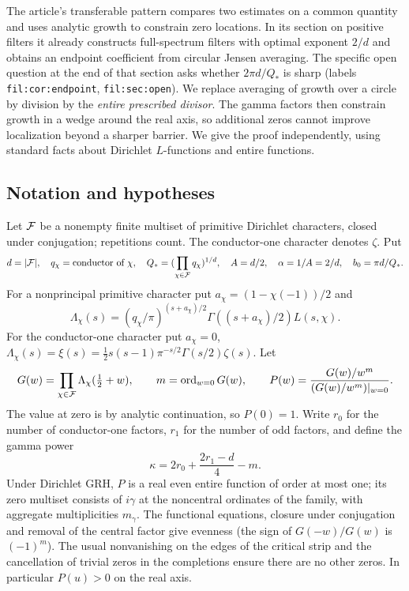 \documentclass[11pt]{article}
\theoremstyle{definition}\newtheorem{definition}[theorem]{Definition}
\theoremstyle{remark}\newtheorem{remark}[theorem]{Remark}
\begin{document}
The article's transferable pattern compares two estimates on a common quantity and uses analytic growth to constrain zero locations. In its section on positive filters it already constructs full-spectrum filters with optimal exponent $2/d$ and obtains an endpoint coefficient from circular Jensen averaging. The specific open question at the end of that section asks whether $2\pi d/Q_*$ is sharp (labels \texttt{fil:cor:endpoint}, \texttt{fil:sec:open}). We replace averaging of growth over a circle by division by the \emph{entire prescribed divisor}. The gamma factors then constrain growth in a wedge around the real axis, so additional zeros cannot improve localization beyond a sharper barrier. We give the proof independently, using standard facts about Dirichlet $L$-functions and entire functions.

\subsection{Notation and hypotheses}
Let $\mathcal F$ be a nonempty finite multiset of primitive Dirichlet characters, closed under conjugation; repetitions count. The conductor-one character denotes $\zeta$. Put
\[
 d=|\mathcal F|,\quad q_\chi=\text{conductor of }\chi,\quad Q_*=(\prod_{\chi\in\mathcal F}q_\chi)^{1/d},
 \quad A=d/2,\quad \alpha=1/A=2/d,\quad b_0=\pi d/Q_*.
\]
For a nonprincipal primitive character put $a_\chi=(1-\chi(-1))/2$ and
\[
 \Lambda_\chi(s)=(q_\chi/\pi)^{(s+a_\chi)/2}\Gamma((s+a_\chi)/2)L(s,\chi).
\]
For the conductor-one character put $a_\chi=0$, $\Lambda_\chi(s)=\xi(s)=\tfrac12s(s-1)\pi^{-s/2}\Gamma(s/2)\zeta(s)$. Let
\[
 G(w)=\prod_{\chi\in\mathcal F}\Lambda_\chi(\tfrac12+w),\qquad m=\operatorname{ord}_{w=0}G(w),\qquad
 P(w)=\frac{G(w)/w^m}{(G(w)/w^m)|_{w=0}}.
\]
The value at zero is by analytic continuation, so $P(0)=1$. Write $r_0$ for the number of conductor-one factors, $r_1$ for the number of odd factors, and define the gamma power
\begin{equation}\label{eq:kappa}
 \kappa=2r_0+\frac{2r_1-d}{4}-m.
\end{equation}
Under Dirichlet GRH, $P$ is a real even entire function of order at most one; its zero multiset consists of $i\gamma$ at the noncentral ordinates of the family, with aggregate multiplicities $m_\gamma$. The functional equations, closure under conjugation and removal of the central factor give evenness (the sign of $G(-w)/G(w)$ is $(-1)^m$). The usual nonvanishing on the edges of the critical strip and the cancellation of trivial zeros in the completions ensure there are no other zeros. In particular $P(u)>0$ on the real axis.
\end{document}
